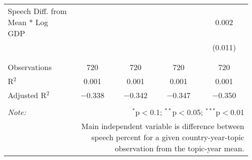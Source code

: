 \begin{table}[!htbp]
\begin{tabular}{@{\extracolsep{5pt}}lcccc}
 Speech Diff. from Mean * Log GDP &  &  &  & 0.002 \\ 
  &  &  &  & (0.011) \\ 
  & & & & \\ 
\hline \\[-1.8ex] 
Observations & 720 & 720 & 720 & 720 \\ 
R$^{2}$ & 0.001 & 0.001 & 0.001 & 0.001 \\ 
Adjusted R$^{2}$ & $-$0.338 & $-$0.342 & $-$0.347 & $-$0.350 \\ 
\hline 
\hline \\[-1.8ex] 
\textit{Note:}  & \multicolumn{4}{r}{$^{*}$p$<$0.1; $^{**}$p$<$0.05; $^{***}$p$<$0.01} \\ 
 & \multicolumn{4}{r}{Main independent variable is difference between speech percent for a given country-year-topic observation from the topic-year mean.} \\ 
\end{tabular} 
\end{table} 
